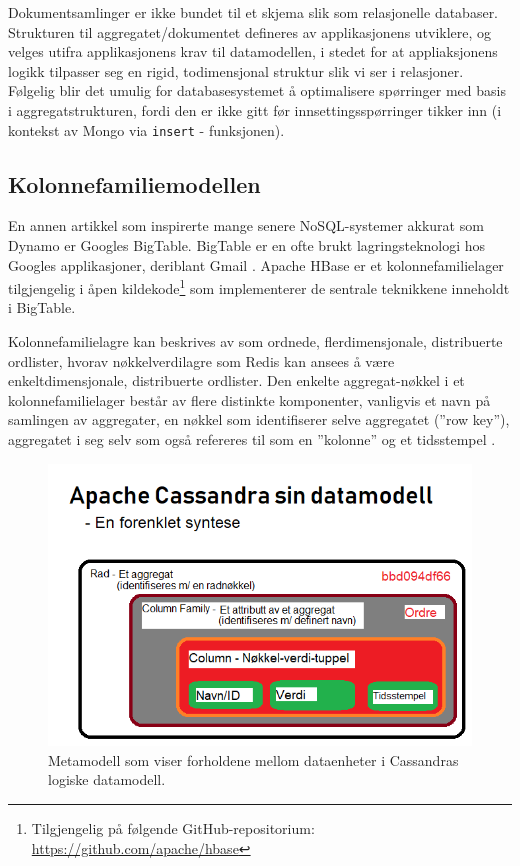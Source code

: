 Dokumentsamlinger er ikke bundet til et skjema slik som relasjonelle databaser. Strukturen til aggregatet/dokumentet defineres av applikasjonens utviklere, og velges utifra applikasjonens krav til datamodellen, i stedet for at appliaksjonens logikk tilpasser seg en rigid, todimensjonal struktur slik vi ser i relasjoner. Følgelig blir det umulig for databasesystemet å optimalisere spørringer med basis i aggregatstrukturen, fordi den er ikke gitt før innsettingsspørringer tikker inn (i kontekst av Mongo via \texttt{insert} - funksjonen).

\subsection{Kolonnefamiliemodellen}

En annen artikkel som inspirerte mange senere NoSQL-systemer akkurat som Dynamo er Googles BigTable. BigTable er en ofte brukt lagringsteknologi hos Googles applikasjoner, deriblant Gmail \citep{elmasri2014}. Apache HBase er et kolonnefamilielager tilgjengelig i åpen kildekode\footnote{Tilgjengelig på følgende GitHub-repositorium: \url{https://github.com/apache/hbase}} som implementerer de sentrale teknikkene inneholdt i BigTable.

Kolonnefamilielagre kan beskrives av \cite{elmasri2014} som ordnede, flerdimensjonale, distribuerte ordlister, hvorav nøkkelverdilagre som Redis kan ansees å være enkeltdimensjonale, distribuerte ordlister. Den enkelte aggregat-nøkkel i et kolonnefamilielager består av flere distinkte komponenter, vanligvis et navn på samlingen av aggregater, en nøkkel som identifiserer selve aggregatet (''row key''), aggregatet i seg selv som også refereres til som en ''kolonne'' og et tidsstempel \citep{elmasri2014}.

\newpage

\begin{figure}[ht]
    \centering
    \includegraphics[scale=0.7]{fig/kolonneorientert.png}
    \caption{Metamodell som viser forholdene mellom dataenheter i Cassandras logiske datamodell.}
    \label{fig3}
\end{figure}

